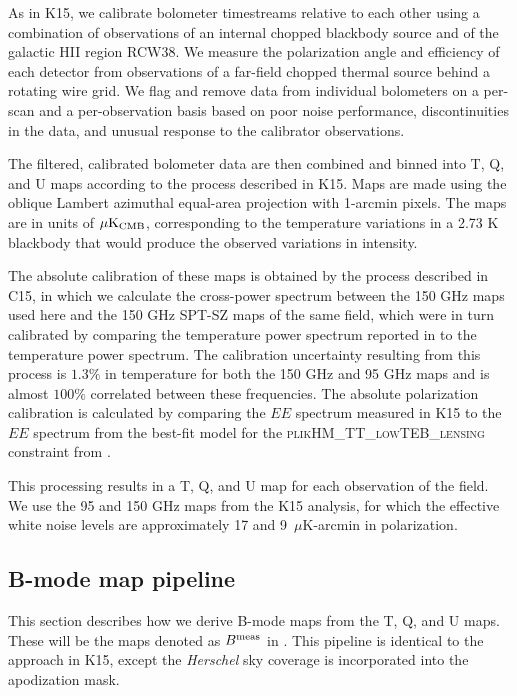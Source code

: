 As in K15, we calibrate bolometer timestreams relative to each other using a combination of observations of an internal chopped blackbody source and of the galactic HII region RCW38.
We measure the polarization angle and efficiency of each detector from observations of a far-field chopped thermal source behind a rotating wire grid.
We flag and remove data from individual bolometers on a per-scan and a per-observation basis based on poor noise performance, discontinuities in the data, and unusual response to the calibrator observations.

The filtered, calibrated bolometer data are then combined and binned into T, Q, and U maps according to the process described in K15.
Maps are made using the oblique Lambert azimuthal equal-area projection with 1-arcmin pixels.
The maps are in units of $\mu {\rm K}_{\rm CMB}$, corresponding to the temperature variations in a 2.73 K blackbody that would produce the observed variations in intensity.

The absolute calibration of these maps is obtained by the process described in C15,
in which we calculate the cross-power spectrum between the 150 GHz maps used here and the 150 GHz SPT-SZ maps of the same field,
which were in turn calibrated by comparing the temperature power spectrum reported in \cite{story13} to the \cite{planck2013XVI} temperature power spectrum.
The calibration uncertainty resulting from this process is $1.3\%$ in temperature for both the 150 GHz and 95 GHz maps and is almost $100\%$ correlated between these frequencies.
The absolute polarization calibration is calculated by comparing the $EE$ spectrum measured in K15 to the $EE$ spectrum from the best-fit \LCDM model for the
\textsc{plikHM\_TT\_lowTEB\_lensing} constraint from \cite{planck15-11}.

This processing results in a T, Q, and U map for each observation of the field.
We use the 95 and 150 GHz maps from the K15 analysis, for which the effective white noise levels are
approximately 17 and 9~$\mu$K-arcmin in polarization.


\subsection{B-mode map pipeline}
\label{sec:bb_maps}
 This section describes how we derive B-mode maps from the T, Q, and U maps.
These will be the maps denoted as $B^{\rm meas}$ in .
This pipeline is identical to the approach in K15, except the \textit{Herschel} sky coverage is incorporated into the apodization mask.

